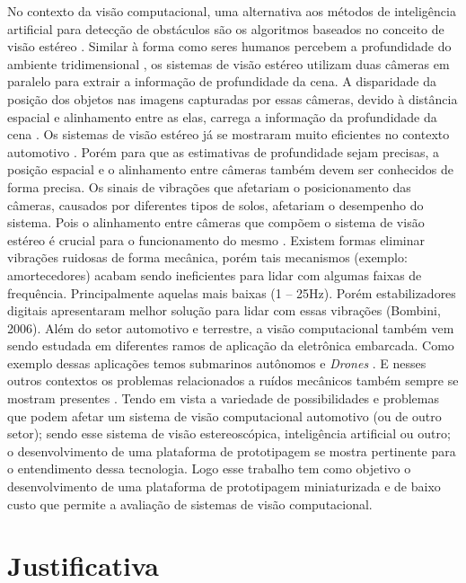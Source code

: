 No contexto da visão computacional, uma alternativa aos métodos de inteligência artificial para detecção de obstáculos são os algoritmos baseados no conceito de visão estéreo \cite{bertozzi1996}. Similar à forma como seres humanos percebem a profundidade do ambiente tridimensional \cite{Marr1977}, os sistemas de visão estéreo utilizam duas câmeras em paralelo para extrair a informação de  profundidade da cena. A disparidade da posição dos objetos nas imagens capturadas por essas câmeras, devido à distância espacial e alinhamento entre as elas, carrega a informação da profundidade da cena \cite{lu2013}. Os sistemas de visão estéreo já se mostraram muito eficientes no contexto automotivo \cite{bertozzi1996}. Porém para que as estimativas de profundidade sejam precisas, a posição espacial e o alinhamento entre câmeras também devem ser conhecidos de forma precisa. Os sinais de vibrações que afetariam o posicionamento das câmeras, causados por diferentes tipos de solos, afetariam o desempenho do sistema. Pois o alinhamento entre câmeras que compõem o sistema de visão estéreo é crucial para o funcionamento do mesmo \cite{Setyawan2018}. Existem formas eliminar vibrações ruidosas de forma mecânica, porém tais mecanismos (exemplo: amortecedores) acabam sendo ineficientes para lidar com algumas faixas de frequência. Principalmente aquelas mais baixas (1 – 25Hz). Porém estabilizadores digitais apresentaram melhor solução para lidar com essas vibrações (Bombini, 2006).
Além do setor automotivo e terrestre, a visão computacional também vem sendo estudada em diferentes ramos de aplicação da eletrônica embarcada. Como exemplo dessas aplicações temos submarinos autônomos \cite{naglak2018} e \textit{Drones} \cite{kyristsis2016}. E nesses outros contextos os problemas relacionados a ruídos mecânicos também sempre se mostram presentes \cite{Hitaka2001}.
Tendo em vista a variedade de possibilidades e problemas que podem afetar um sistema de visão computacional automotivo (ou de outro setor); sendo esse sistema de visão estereoscópica, inteligência artificial ou outro; o desenvolvimento de uma plataforma de prototipagem se mostra pertinente para o entendimento dessa tecnologia. Logo esse trabalho tem como objetivo o desenvolvimento de uma plataforma de prototipagem miniaturizada e de baixo custo que permite a avaliação de sistemas de visão computacional. 


\section{Justificativa}

